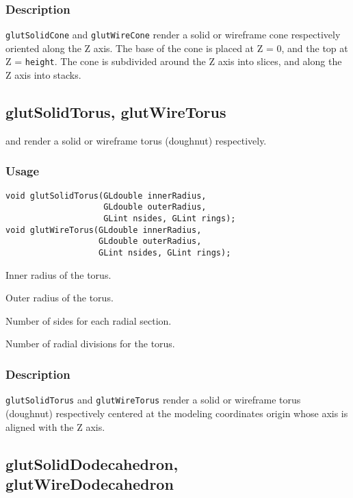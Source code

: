 \subsubsection*{Description}

{\tt glutSolidCone} and {\tt glutWireCone} render a solid or wireframe
cone respectively oriented along the Z axis.  The base of the cone
is placed at Z = 0, and the top at Z = {\tt height}.  The cone is subdivided
around the Z axis into slices, and along the Z axis into stacks.

\subsection{glutSolidTorus, glutWireTorus}

 and  render a solid or wireframe
torus (doughnut) respectively.

\subsubsection*{Usage}
\begin{verbatim}
void glutSolidTorus(GLdouble innerRadius,
                    GLdouble outerRadius,
                    GLint nsides, GLint rings);
void glutWireTorus(GLdouble innerRadius,
                   GLdouble outerRadius,
                   GLint nsides, GLint rings);
\end{verbatim}
\begin{description}
\itemsep 0in
\item[\tt innerRadius]
Inner radius of the torus.
\item[\tt outerRadius]
Outer radius of the torus.
\item[\tt nsides]
Number of sides for each radial section.
\item[\tt rings]
Number of radial divisions for the torus.
\end{description}

\subsubsection*{Description}

{\tt glutSolidTorus} and {\tt glutWireTorus} render a solid or wireframe
torus (doughnut) respectively centered at the modeling coordinates origin whose axis is aligned
with the Z axis.

\subsection{glutSolidDodecahedron, glutWireDodecahedron}

